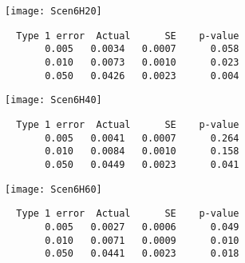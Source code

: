 \documentclass[11pt,a4paper]{article}
\begin{document}
\begin{itemize}
\begin{minipage}{.5\textwidth}
\texttt{[image: Scen6H20]}
\end{minipage}
\begin{minipage}{.5\textwidth}
\begin{verbatim}
  Type 1 error  Actual      SE    p-value
       0.005   0.0034   0.0007      0.058
       0.010   0.0073   0.0010      0.023
       0.050   0.0426   0.0023      0.004
\end{verbatim}
\end{minipage}

\begin{minipage}{.5\textwidth}
\texttt{[image: Scen6H40]}
\end{minipage}
\begin{minipage}{.5\textwidth}
\begin{verbatim}
  Type 1 error  Actual      SE    p-value
       0.005   0.0041   0.0007      0.264
       0.010   0.0084   0.0010      0.158
       0.050   0.0449   0.0023      0.041
\end{verbatim}
\end{minipage}

\begin{minipage}{.5\textwidth}
\texttt{[image: Scen6H60]}
\end{minipage}
\begin{minipage}{.5\textwidth}
\begin{verbatim}
  Type 1 error  Actual      SE    p-value
       0.005   0.0027   0.0006      0.049
       0.010   0.0071   0.0009      0.010
       0.050   0.0441   0.0023      0.018
\end{verbatim}
\end{minipage}

\end{itemize}
\end{document}
